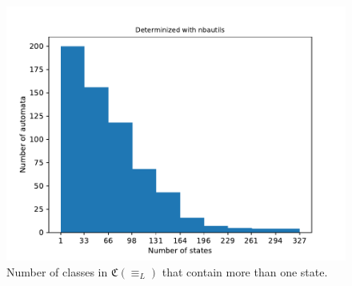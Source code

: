 \begin{figure}
\begin{minipage}{0.49\textwidth}
		\includegraphics[page=4,height=.3\textheight]{../data/analysis/rawstats_detnbaut.pdf}
		\caption{Number of classes in $\mathfrak{C}(\equiv_L)$ that contain more than one state.}
		\label{fig:rawstats:rawstats_langclasnum}
	\end{minipage}
\end{figure}


